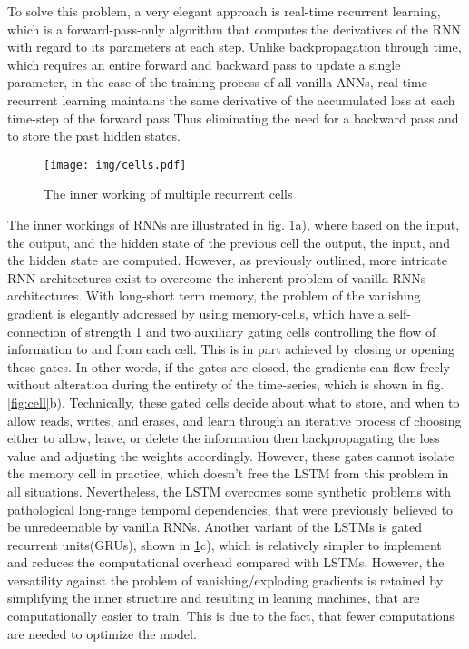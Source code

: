 To solve this problem, a very elegant approach is real-time recurrent learning, which is a forward-pass-only algorithm that computes the derivatives of the RNN with regard to its parameters at each step. Unlike backpropagation through time, which requires an entire forward and backward pass to update a single parameter, in the case of the training process of all vanilla ANNs, real-time recurrent learning maintains the same derivative of the accumulated loss at each time-step of the forward pass Thus eliminating the need for a backward pass and to store the past hidden states\cite{hochreiter1997long}.\newline
\begin{figure}[H]
	\begin{center}
		\texttt{[image: img/cells.pdf]}
		\caption{The inner working of multiple recurrent cells}
		\label{fig:cells}
	\end{center}
\end{figure}
The inner workings of RNNs are illustrated in fig. \ref{fig:cells}a), where based on the input, the output, and the hidden state of the previous cell the output, the input, and the hidden state are computed. However, as previously outlined, more intricate RNN architectures exist to overcome the inherent problem of vanilla RNNs architectures. With long-short term memory, the problem of the vanishing gradient is elegantly addressed by using memory-cells, which have a self-connection of strength 1 and two auxiliary gating cells controlling the flow of information to and from each cell. This is in part achieved by closing or opening these gates. In other words, if the gates are closed, the gradients can flow freely without alteration during the entirety of the time-series, which is shown in fig. \ref{fig:cell}b). Technically, these gated cells decide about what to store, and when to allow reads, writes, and erases, and learn through an iterative process of choosing either to allow, leave, or delete the information then backpropagating the loss value and adjusting the weights accordingly\cite{kumar2018energy}. However, these gates cannot isolate the memory cell in practice, which doesn't free the LSTM from this problem in all situations. Nevertheless, the LSTM overcomes some synthetic problems with pathological long-range temporal dependencies, that were previously believed to be unredeemable by vanilla RNNs\cite{sutskever2013training}.\newline
Another variant of the LSTMs is gated recurrent units(GRUs), shown in \ref{fig:cells}c), which is relatively simpler to implement and reduces the computational overhead compared with LSTMs. However, the versatility against the problem of vanishing/exploding gradients is retained by simplifying the inner structure and resulting in leaning machines, that are computationally easier to train. This is due to the fact, that fewer computations are needed to optimize the model.\newline
